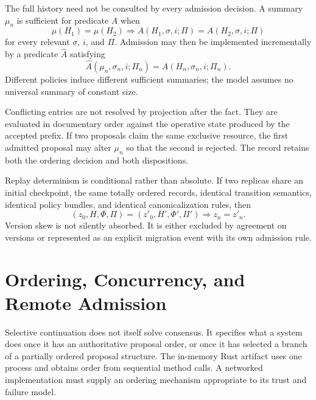 \documentclass[11pt]{article}
\begin{document}
The full history need not be consulted by every admission decision. A summary $\mu_n$ is sufficient for predicate $A$ when
\begin{equation}
  \mu(H_1)=\mu(H_2)
  \Longrightarrow
  A(H_1,\sigma,i;\Pi)=A(H_2,\sigma,i;\Pi)
  \label{eq:sufficient-history}
\end{equation}
for every relevant $\sigma$, $i$, and $\Pi$. Admission may then be implemented incrementally by a predicate $\widehat{A}$ satisfying
\begin{equation}
  \widehat{A}(\mu_n,\sigma_n,i;\Pi_n)
  = A(H_n,\sigma_n,i;\Pi_n).
  \label{eq:incremental-admission}
\end{equation}
Different policies induce different sufficient summaries; the model assumes no universal summary of constant size.

Conflicting entries are not resolved by projection after the fact. They are evaluated in documentary order against the operative state produced by the accepted prefix. If two proposals claim the same exclusive resource, the first admitted proposal may alter $\mu_n$ so that the second is rejected. The record retains both the ordering decision and both dispositions.

Replay determinism is conditional rather than absolute. If two replicas share an initial checkpoint, the same totally ordered records, identical transition semantics, identical policy bundles, and identical canonicalization rules, then
\begin{equation}
  (z_0,H,\Phi,\Pi)=(z'_0,H',\Phi',\Pi')
  \Longrightarrow z_n=z'_n.
  \label{eq:replay-determinism}
\end{equation}
Version skew is not silently absorbed. It is either excluded by agreement on versions or represented as an explicit migration event with its own admission rule.

\section{Ordering, Concurrency, and Remote Admission}

Selective continuation does not itself solve consensus. It specifies what a system does once it has an authoritative proposal order, or once it has selected a branch of a partially ordered proposal structure. The in-memory Rust artifact uses one process and obtains order from sequential method calls. A networked implementation must supply an ordering mechanism appropriate to its trust and failure model.
\end{document}
